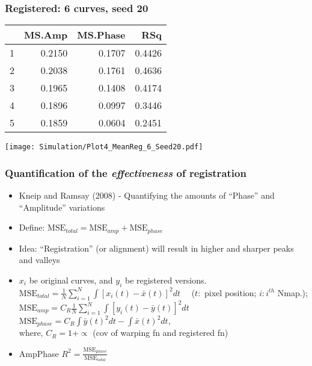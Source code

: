 \documentclass[10pt,dvipsnames,table]{beamer}
\begin{document}
\begin{frame}
\frametitle{Registered: 6 curves, seed 20}

\begin{table}[ht]
\footnotesize
\centering
\begin{tabular}{rrrr}
  \hline
 & MS.Amp & MS.Phase & RSq \\ 
  \hline
1 & 0.2150 & 0.1707 & 0.4426 \\ 
  2 & 0.2038 & 0.1761 & 0.4636 \\ 
  3 & 0.1965 & 0.1408 & 0.4174 \\ 
  4 & 0.1896 & 0.0997 & 0.3446 \\ 
  5 & 0.1859 & 0.0604 & 0.2451 \\ 
   \hline
\end{tabular}
\end{table}

\begin{center}
\texttt{[image: Simulation/Plot4\_MeanReg\_6\_Seed20.pdf]} 
\end{center}
\end{frame}

\begin{frame}
\frametitle{Quantification of the {\emph{effectiveness}} of registration}
\begin{itemize}
\item Kneip and Ramsay (2008) - Quantifying the amounts of ``Phase'' and ``Amplitude'' variations
\item Define: $\text{MSE}_{total} = \text{MSE}_{amp} + \text{MSE}_{phase}$
\item Idea: ``Registration'' (or alignment) will result in higher and sharper peaks and valleys
\item $x_i$ be original curves, and $y_i$ be registered versions. $\text{MSE}_{total} = \frac{1}{N}\sum\limits_{i=1}^{N}\int[x_i(t) - \bar{x}(t)]^2dt$ \ \ {\footnotesize{($t:$ pixel position; $i: i^{th}$ Nmap.)}}; 
$\text{MSE}_{amp} = C_R\frac{1}{N}\sum\limits_{i=1}^{N}\int[y_i(t) - \bar{y}(t)]^2dt$ \\
$\text{MSE}_{phase} = C_R\int \bar{y}(t)^2 dt - \int \bar{x}(t)^2 dt$, \\ where, $C_R = 1 + \propto $ (cov of warping fn and registered fn)

\item AmpPhase $R^2 = \frac{\text{MSE}_{phase}}{\text{MSE}_{total}}$
\end{itemize}
\end{frame}
\end{document}

